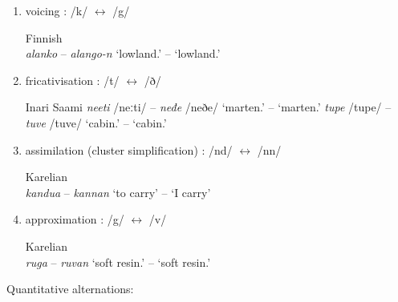 \documentclass[a4paper, 12pt]{article}
\begin{document}
	\begin{enumerate}[$\gg$]
	\setlength\itemsep{0em}
		\item voicing : /k/ $\leftrightarrow$ /g/
		
		\ex Finnish\\
			\emph{alanko} -- \emph{alango-n} \hfill `lowland.{\Nom}' -- `lowland.{\Gen}'
		\xe
		
		\item fricativisation : /t/ $\leftrightarrow$ /ð/
				
		\pex Inari Saami \parencite{valtonen2022}
			\a \emph{neeti} /neːti/ -- \emph{neđe} /neðe/ \hfill `marten.{\Nom}' -- `marten.{\Gen}'
			\a \emph{tupe} /tupe/ -- \emph{tuve} /tuve/ \hfill `cabin.{\Nom}' -- `cabin.{\Gen}'
		\xe
		
		\item assimilation (cluster simplification) : /nd/ $\leftrightarrow$ /nn/
		
		\ex Karelian \parencite{ryagoev1993}\\
			\emph{kandua} -- \emph{kannan} \hfill `to carry' -- `I carry'
		\xe
		
		\item approximation : /g/ $\leftrightarrow$ /v/
		
		\ex Karelian \parencite{ryagoev1993}\\
			\emph{ruga} -- \emph{ruvan} \hfill `soft resin.{\Nom}' -- `soft resin.{\Gen}'
		\xe
		
	\end{enumerate}
	
	\noindent Quantitative alternations:
	
\end{document}

